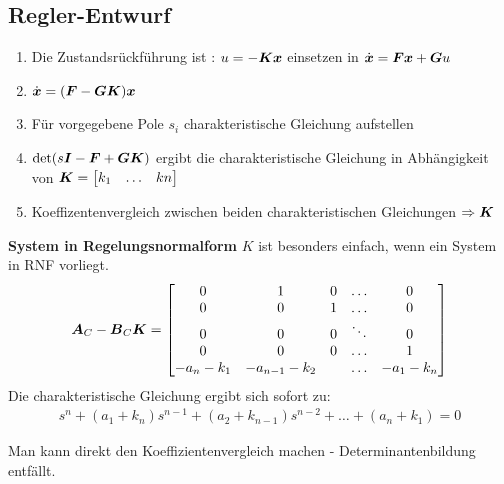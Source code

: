 \subsection{Regler-Entwurf}
\begin{tcolorbox}[colback=white!10!white,colframe=green!30!black] 

    \begin{enumerate}
        \item     Die Zustandsrückführung ist : $u = -\boldsymbol{Kx}$ einsetzen in $\dot{\boldsymbol{x}} = \boldsymbol{Fx}+\boldsymbol{G}u$
        \item $\dot{\boldsymbol{x}} = (\boldsymbol{F}-\boldsymbol{GK})\boldsymbol{x}$
        \item Für vorgegebene Pole $s_i$ charakteristische Gleichung aufstellen
        \item $\det (s\boldsymbol{I}-\boldsymbol{F}+\boldsymbol{GK})$ ergibt die charakteristische Gleichung in Abhängigkeit von $\boldsymbol{K} = \begin{bmatrix}
        k_1 & \ldots & kn
        \end{bmatrix}$
        \item Koeffizentenvergleich zwischen beiden charakteristischen Gleichungen $\Rightarrow \boldsymbol{K}$ 
    \end{enumerate} 
\tcblower
\textbf{System in Regelungsnormalform}
$K$ ist besonders einfach, wenn ein System in RNF vorliegt.
\begin{align*}
    \boldsymbol{A}_C-\boldsymbol{B}_C\boldsymbol{K} = \begin{bmatrix}
    0 & 1& 0&\ldots&0\\     0 & 0& 1&\ldots&0\\
    0 & 0& 0&\ddots&0\\
    0 & 0& 0&\ldots&1\\
    -a_n-k_1 & -a_{n-1}-k_2& &\ldots&-a_{1}-k_n\\
    \end{bmatrix}
\end{align*}
Die charakteristische Gleichung ergibt sich sofort zu:
\begin{align*}
    s^n +(a_1+k_n)s^{n-1}+(a_2+k_{n-1})s^{n-2}+\ldots+(a_n+k_1) =0 
\end{align*}

Man kann direkt den Koeffizientenvergleich machen - Determinantenbildung entfällt.
    
\end{tcolorbox}


